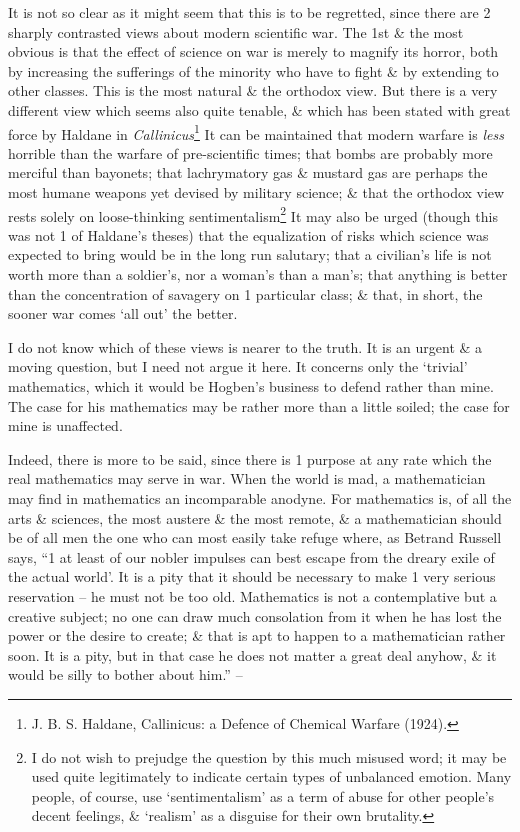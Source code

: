 \documentclass{article}
\numberwithin{equation}{section}
\begin{document}
It is not so clear as it might seem that this is to be regretted, since there are 2 sharply contrasted views about modern scientific war. The 1st \& the most obvious is that the effect of science on war is merely to magnify its horror, both by increasing the sufferings of the minority who have to fight \& by extending to other classes. This is the most natural \& the orthodox view. But there is a very different view which seems also quite tenable, \& which has been stated with great force by Haldane in \textit{Callinicus}\footnote{J. B. S. Haldane, Callinicus: a Defence of Chemical Warfare (1924).} It can be maintained that modern warfare is \textit{less} horrible than the warfare of pre-scientific times; that bombs are probably more merciful than bayonets; that lachrymatory gas \& mustard gas are perhaps the most humane weapons yet devised by military science; \& that the orthodox view rests solely on loose-thinking sentimentalism\footnote{I do not wish to prejudge the question by this much misused word; it may be used quite legitimately to indicate certain types of unbalanced emotion. Many people, of course, use `sentimentalism' as a term of abuse for other people's decent feelings, \& `realism' as a disguise for their own brutality.} It may also be urged (though this was not 1 of Haldane's theses) that the equalization of risks which science was expected to bring would be in the long run salutary; that a civilian's life is not worth more than a soldier's, nor a woman's than a man's; that anything is better than the concentration of savagery on 1 particular class; \& that, in short, the sooner war comes `all out' the better.

I do not know which of these views is nearer to the truth. It is an urgent \& a moving question, but I need not argue it here. It concerns only the `trivial' mathematics, which it would be Hogben's business to defend rather than mine. The case for his mathematics may be rather more than a little soiled; the case for mine is unaffected.

Indeed, there is more to be said, since there is 1 purpose at any rate which the real mathematics may serve in war. When the world is mad, a mathematician may find in mathematics an incomparable anodyne. For mathematics is, of all the arts \& sciences, the most austere \& the most remote, \& a mathematician should be of all men the one who can most easily take refuge where, as Betrand Russell says, ``1 at least of our nobler impulses can best escape from the dreary exile of the actual world'. It is a pity that it should be necessary to make 1 very serious reservation -- he must not be too old. Mathematics is not a contemplative but a creative subject; no one can draw much consolation from it when he has lost the power or the desire to create; \& that is apt to happen to a mathematician rather soon. It is a pity, but in that case he does not matter a great deal anyhow, \& it would be silly to bother about him.'' -- \cite[pp. 139--143]{Hardy1992}
\end{document}
